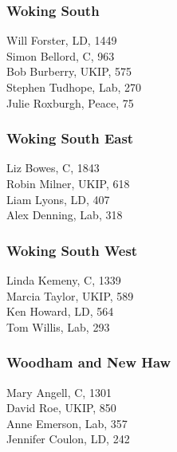\documentclass[a4paper,openany,10pt]{book}
\begin{document}
\subsubsection*{Woking South}



Will Forster, LD, 1449\\
Simon Bellord, C, 963\\
Bob Burberry, UKIP, 575\\
Stephen Tudhope, Lab, 270\\
Julie Roxburgh, Peace, 75\\


\subsubsection*{Woking South East}



Liz Bowes, C, 1843\\
Robin Milner, UKIP, 618\\
Liam Lyons, LD, 407\\
Alex Denning, Lab, 318\\


\subsubsection*{Woking South West}



Linda Kemeny, C, 1339\\
Marcia Taylor, UKIP, 589\\
Ken Howard, LD, 564\\
Tom Willis, Lab, 293\\


\subsubsection*{Woodham and New Haw}



Mary Angell, C, 1301\\
David Roe, UKIP, 850\\
Anne Emerson, Lab, 357\\
Jennifer Coulon, LD, 242\\
\end{document}
